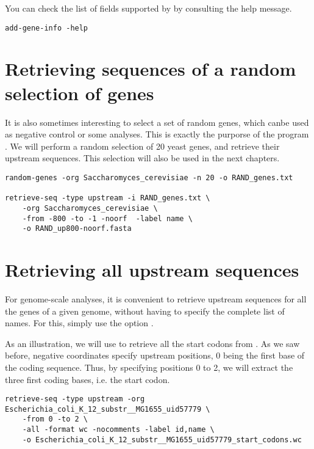 You can check the list of fields supported by 
by consulting the help message.

\begin{lstlisting}
add-gene-info -help
\end{lstlisting}


\section{Retrieving sequences of a random selection of genes}

It is also sometimes interesting to select a set of random genes,
which canbe used as negative control or some analyses. This is exactly
the purporse of the program . We will perform a
random selection of 20 yeast genes, and retrieve their upstream
sequences. This selection will also be used in the next chapters.


\begin{lstlisting}
random-genes -org Saccharomyces_cerevisiae -n 20 -o RAND_genes.txt

retrieve-seq -type upstream -i RAND_genes.txt \
    -org Saccharomyces_cerevisiae \
    -from -800 -to -1 -noorf  -label name \
    -o RAND_up800-noorf.fasta
\end{lstlisting}

\section{Retrieving all upstream sequences}

For genome-scale analyses, it is convenient to retrieve upstream
sequences for all the genes of a given genome, without having to
specify the complete list of names. For this, simply use the option
\option{-all}.

As an illustration, we will use \command{retrieve-seq} to retrieve all
the start codons from . As we saw before,
negative coordinates specify upstream positions, 0 being the first
base of the coding sequence. Thus, by specifying positions 0 to 2, we
will extract the three first coding bases, i.e. the start codon. 

\begin{lstlisting}
retrieve-seq -type upstream -org Escherichia_coli_K_12_substr__MG1655_uid57779 \
    -from 0 -to 2 \
    -all -format wc -nocomments -label id,name \
    -o Escherichia_coli_K_12_substr__MG1655_uid57779_start_codons.wc
\end{lstlisting}


